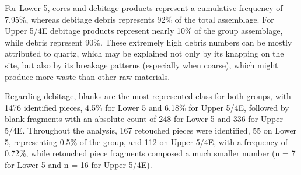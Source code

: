 \documentclass[12pt,twoside]{reedthesis}
\begin{document}
For Lower 5, cores and debitage products represent a cumulative frequency of 7.95\%, whereas debitage debris represents 92\% of the total assemblage. For Upper 5/4E debitage products represent nearly 10\% of the group assemblage, while debris represent 90\%. These extremely high debris numbers can be mostly attributed to quartz, which may be explained not only by its knapping on the site, but also by its breakage patterns (especially when coarse), which might produce more waste than other raw materials.

Regarding debitage, blanks are the most represented class for both groups, with 1476 identified pieces, 4.5\% for Lower 5 and 6.18\% for Upper 5/4E, followed by blank fragments with an absolute count of 248 for Lower 5 and 336 for Upper 5/4E. Throughout the analysis, 167 retouched pieces were identified, 55 on Lower 5, representing 0.5\% of the group, and 112 on Upper 5/4E, with a frequency of 0.72\%, while retouched piece fragments composed a much smaller number (n = 7 for Lower 5 and n = 16 for Upper 5/4E).
\end{document}
